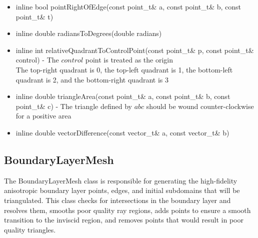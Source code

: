 \documentclass[manuscript, screen]{acmart}
\begin{document}
\begin{itemize}
\item inline bool pointRightOfEdge(const point\_t\& a, const point\_t\& b, const point\_t\& t)

\item inline double radiansToDegrees(double radians)

\item inline int relativeQuadrantToControlPoint(const point\_t\& p, const point\_t\& control) - The $control$ point is treated as the origin\\
The top-right quadrant is 0, the top-left quadrant is 1, the bottom-left quadrant is 2, and the bottom-right quadrant is 3

\item inline double triangleArea(const point\_t\& a, const point\_t\& b, const point\_t\& c) - The triangle defined by $abc$ should be wound counter-clockwise for a positive area

\item inline double vectorDifference(const vector\_t\& a, const vector\_t\& b)

\end{itemize}

\subsection{BoundaryLayerMesh}

The BoundaryLayerMesh class is responsible for generating the high-fidelity anisotropic boundary layer points, edges, and initial subdomains that will be triangulated. This class checks for intersections in the boundary layer and resolves them, smooths poor quality ray regions, adds points to ensure a smooth transition to the inviscid region, and removes points that would result in poor quality triangles.
\end{document}
